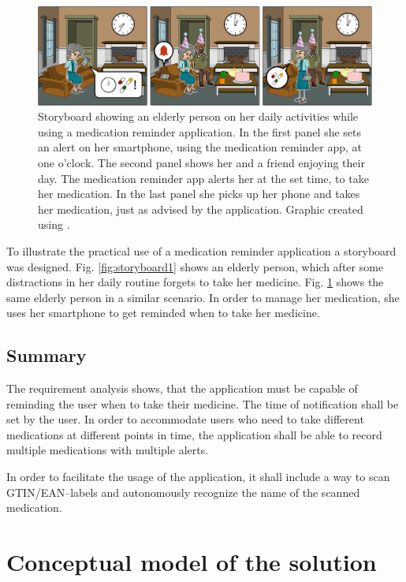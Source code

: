 \documentclass[conference]{IEEEtran}
\begin{document}
\begin{figure}
	\includegraphics[width=\textwidth]{images/storyboard02.png}
	\caption
	{Storyboard showing an elderly person on her daily activities while using a medication reminder application.
		In the first panel she sets an alert on her smartphone, using the medication reminder app, at one o'clock.
		The second panel shows her and a friend enjoying their day. The medication reminder app alerts her at the set time, to take her medication.
		In the last panel she picks up her phone and takes her medication, just as advised by the application.
		Graphic created using \cite{storyboard}.}
	\label{fig:storyboard2}
\end{figure}

To illustrate the practical use of a medication reminder application a storyboard was designed.
Fig. \ref{fig:storyboard1} shows an elderly person, which after some distractions in her daily
routine forgets to take her medicine.
Fig. \ref{fig:storyboard2} shows the same elderly person in a similar scenario. In order to manage
her medication, she uses her smartphone to get reminded when to take her medicine.

\subsection{Summary}
The requirement analysis shows, that the application must be capable of reminding the user when to take
their medicine. The time of notification shall be set by the user. In order to accommodate users who need
to take different medications at different points in time, the application shall be able to record multiple
medications with multiple alerts.

In order to facilitate the usage of the application, it shall include a way to scan GTIN/EAN--labels and
autonomously recognize the name of the scanned medication.

\section{Conceptual model of the solution}
\end{document}
